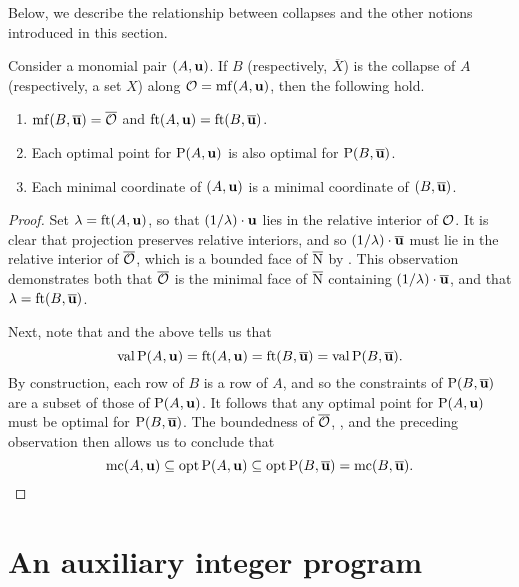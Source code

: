 \documentclass[11pt]{amsart}
\renewcommand{\!}[1]{{\color{red}\text{$\star$\,}#1\,$\star$}}
\newcommand{\ol}[1]{\overline{#1}}
\begin{document}
Below, we describe the relationship between collapses and the other notions introduced in this section.

\begin{corollary}
\label{collapse of mf and mc: C}
Consider a monomial pair $(A, \mathbf{u})$.  If $B$ (respectively, $\ol{X}$) is the collapse of $A$ (respectively, a set $X$) along $\mathcal{O} = \operatorname{mf}(A, \mathbf{u})$, then the following hold.

\begin{enumerate}
\item $\mf(B, \ol{\vv{u}}) = \ol{\O}$ and $\ft{A}{\vv{u}} = \ft{B}{\ol{\vv{u}}}$.
\item Each optimal point for $\mathrm{P}(A, \mathbf{u})$ is also optimal for $\LP(B, \ol{\vv{u}})$.  
\item Each minimal coordinate of $(A, \mathbf{u})$ is a minimal coordinate of $(B, \ol{\vv{u}})$.
\end{enumerate}
\end{corollary}

\begin{proof}
Set $\lambda = \operatorname{ft}(A, \mathbf{u})$, so that $(1 / \lambda) \cdot \mathbf{u}$ lies in the relative interior of $\mathcal{O}$.  It is clear that projection preserves relative interiors, and so $(1/\lambda) \cdot \ol{\vv{u}}$ must lie in the relative interior of $\ol{\O}$, which is a bounded face of $\ol{\N}$ by .  This observation demonstrates both that $\ol{\O}$ is the minimal face of $\ol{\N}$ containing $(1/\lambda) \cdot \ol{\vv{u}}$, and that $\lambda = \ft{B}{\ol{\vv{u}}}$.  

Next, note that  and the above tells us that \[ \val \LP(A, \vv{u}) = \ft{A}{\vv{u}} = \ft{B}{\ol{\vv{u}}} = \val \LP(B, \ol{\vv{u}}). \] 
%
By construction, each row of $B$ is a row of $A$, and so the constraints of $\LP(B, \ol{\vv{u}})$ are a subset of those of $\mathrm{P}(A, \mathbf{u})$.  It follows that any optimal point for $\mathrm{P}(A, \mathbf{u})$ must be optimal for $\LP(B, \ol{\vv{u}})$.  The boundedness of $\ol{\O}$, , and the preceding observation then allows us to conclude that
\[ \mc(A, \vv{u}) \subseteq \opt \LP(A, \vv{u}) \subseteq \opt \LP(B, \ol{\vv{u}}) = \mc(B, \ol{\vv{u}}).\] 
\end{proof}




\newpage
\section{An auxiliary integer program}
\end{document}
